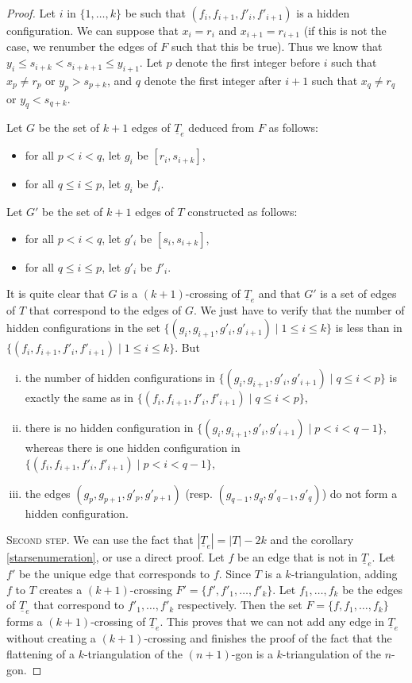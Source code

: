 \documentclass[12pt]{amsart}
\begin{document}
\begin{proof}
Let $i$ in $\{1,\ldots,k\}$ be such that $(f_i,f_{i+1},f'_i,f'_{i+1})$ is a hidden configuration. We can suppose that $x_i=r_i$ and $x_{i+1}=r_{i+1}$ (if this is not the case, we renumber the edges of $F$ such that this be true). Thus we know that $y_i\le s_{i+k}<s_{i+k+1}\le y_{i+1}$. Let $p$ denote the first integer before $i$ such that $x_p \ne r_p$ or $y_p>s_{p+k}$, and $q$ denote the first integer after $i+1$ such that $x_q \ne r_q$ or $y_q<s_{q+k}$.

Let $G$ be the set of $k+1$ edges of $\underline{T}_e$ deduced from $F$ as follows:
\begin{itemize}
\item for all $p<i<q$, let $g_i$ be $[r_i,s_{i+k}]$,
\item for all $q\le i\le p$, let $g_i$ be $f_i$.
\end{itemize}
Let $G'$ be the set of $k+1$ edges of $T$ constructed as follows:
\begin{itemize}
\item for all $p<i<q$, let $g'_i$ be $[s_i,s_{i+k}]$,
\item for all $q\le i\le p$, let $g'_i$ be $f'_i$.
\end{itemize}
		
It is quite clear that $G$ is a $(k+1)$-crossing of $\underline{T}_e$ and that $G'$ is a set of edges of $T$ that correspond to the edges of $G$. We just have to verify that the number of hidden configurations in the set $\{(g_i,g_{i+1},g'_i,g'_{i+1})\;|\; 1\le i\le k\}$ is less than in $\{(f_i,f_{i+1},f'_i,f'_{i+1})\;|\; 1\le i\le k\}$. But
\begin{enumerate}[(i)]
\item the number of hidden configurations in $\{(g_i,g_{i+1},g'_i,g'_{i+1})\;|\; q\le i<p\}$ is exactly the same as in $\{(f_i,f_{i+1},f'_i,f'_{i+1})\;|\; q\le i<p\}$,
\item there is no hidden configuration in $\{(g_i,g_{i+1},g'_i,g'_{i+1})\;|\; p<i<q-1\}$, whereas there is one hidden configuration in $\{(f_i,f_{i+1},f'_i,f'_{i+1})\;|\; p<i<q-1\}$,
\item the edges $(g_p,g_{p+1},g'_p,g'_{p+1})$ (resp. $(g_{q-1},g_q,g'_{q-1},g'_q)$) do not form a hidden configuration.
\end{enumerate}


\medskip
\noindent\textsc{Second step.}
We can use the fact that $|\underline{T}_e|=|T|-2k$ and the corollary \ref{starsenumeration}, or use a direct proof. Let $f$ be an edge that is not in $\underline{T}_e$. Let $f'$ be the unique edge that corresponds to $f$. Since $T$ is a $k$-triangulation, adding $f$ to $T$ creates a $(k+1)$-crossing $F'=\{f',f'_1,\ldots,f'_k\}$. Let $f_1,\ldots,f_k$ be the edges of $\underline{T}_e$ that correspond to $f'_1,\ldots,f'_k$ respectively. Then the set $F=\{f,f_1,\ldots,f_k\}$ forms a $(k+1)$-crossing of $\underline{T}_e$. This proves that we can not add any edge in $\underline{T}_e$ without creating a $(k+1)$-crossing and finishes the proof of the fact that the flattening of a $k$-triangulation of the $(n+1)$-gon is a $k$-triangulation of the $n$-gon.


\end{proof}
\end{document}
